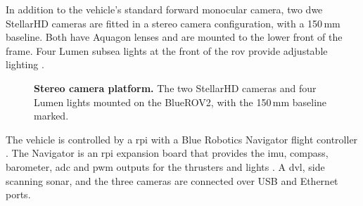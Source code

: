 In addition to the vehicle's standard forward monocular camera,
two \gls{dwe} StellarHD cameras \cite{dweStellarHDDatasheet} are fitted in a stereo camera configuration, 
with a 150\,mm baseline. Both have Aquagon lenses \cite{dweAquagon} and are mounted to the lower front of the frame.
Four Lumen subsea lights at the front of the \gls{rov} provide adjustable lighting
 \cite{bluerobLumen}.

 \begin{figure}[H]
    \centering
    
    \caption[Stereo camera rig]{\textbf{Stereo camera platform.} The two StellarHD
    cameras and four Lumen lights mounted on the BlueROV2, with the 150\,mm baseline marked.}
    \label{fig:ch4.rig}
\end{figure}
 
The vehicle is controlled by a \gls{rpi} with a
Blue Robotics Navigator flight controller \cite{bluerobNavigator}. The Navigator is an \gls{rpi}
expansion board that provides the \gls{imu}, compass,
barometer, \gls{adc} and \gls{pwm} outputs for the thrusters and lights
\cite{bluerobNavigator}. A \gls{dvl}, side scanning sonar, and the three cameras are connected over USB and Ethernet ports.
